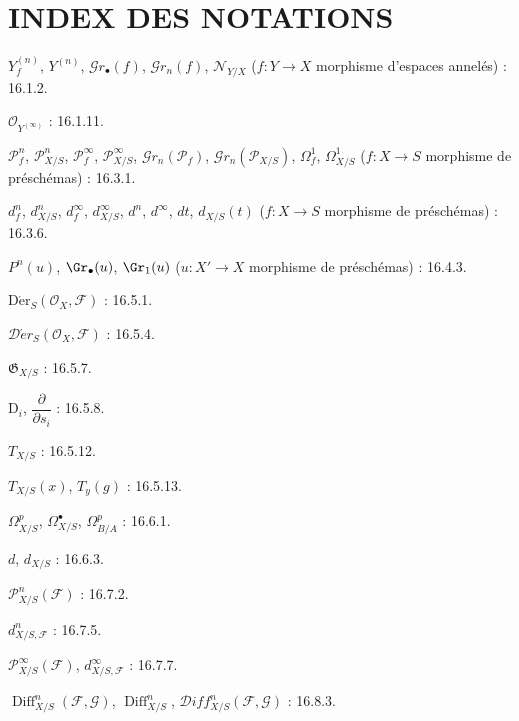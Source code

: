 \clearpage
{}
{}
\section*{INDEX DES NOTATIONS}

\begingroup
\small
\setlength{\parindent}{0pt}
\setlength{\parskip}{1.5pt}

$Y_f^{(n)}$, $Y^{(n)}$, $\mathcal{G}r_{\bullet}(f)$,
$\mathcal{G}r_n(f)$, $\mathcal{N}_{Y/X}$
($f:Y\to X$ morphisme d'espaces annelés) : 16.1.2.

$\mathcal{O}_{Y^{(\infty)}}$ : 16.1.11.

$\mathcal{P}^{n}_{f}$, $\mathcal{P}^{n}_{X/S}$,
$\mathcal{P}^{\infty}_{f}$, $\mathcal{P}^{\infty}_{X/S}$, $\mathcal{G}r_n(\mathcal{P}_f)$, $\mathcal{G}r_n(\mathcal{P}_{X/S})$,
$\varOmega^{1}_{f}$, $\varOmega^{1}_{X/S}$
($f:X\to S$ morphisme de préschémas) : 16.3.1.

$d^{n}_{f}$, $d^{n}_{X/S}$, $d^{\infty}_{f}$,
$d^{\infty}_{X/S}$, $d^{n}$, $d^{\infty}$, $dt$, $d_{X/S}(t)$
($f:X\to S$ morphisme de préschémas) : 16.3.6.

$P^{n}(u)$, $\Gr_{\bullet}(u)$, $\Gr_{1}(u)$
($u:X'\to X$ morphisme de préschémas) : 16.4.3.

$\operatorname{D\acute{e}r}_{S}(\mathcal{O}_{X},\mathcal{F})$ : 16.5.1.

$\mathcal{D}\acute{e}r_{S}(\mathcal{O}_{X},\mathcal{F})$ : 16.5.4.

$\mathfrak{G}_{X/S}$ : 16.5.7.

$\mathrm{D}_i$, $\dfrac{\partial}{\partial s_i}$ : 16.5.8.

$T_{X/S}$ : 16.5.12.

$T_{X/S}(x)$, $T_y(g)$ : 16.5.13.

$\varOmega^p_{X/S}$, $\varOmega^\bullet_{X/S}$, $\Omega^p_{B/A}$ : 16.6.1.

$d$, $d_{X/S}$ : 16.6.3.

$\mathcal{P}^n_{X/S}(\mathcal{F})$ : 16.7.2.

$d^n_{X/S,\mathcal{F}}$ : 16.7.5.

$\mathcal{P}^{\infty}_{X/S}(\mathcal{F})$,
$d^{\infty}_{X/S,\mathcal{F}}$ : 16.7.7.

$\operatorname{Diff}^{n}_{X/S}(\mathcal{F},\mathcal{G})$,
$\operatorname{Diff}^{n}_{X/S}$,
$\mathcal{D}iff^{n}_{X/S}(\mathcal{F},\mathcal{G})$ : 16.8.3.

